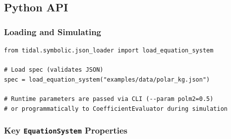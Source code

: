 \subsection{Python API}
\label{sec:json-python-api}

\subsubsection{Loading and Simulating}
\label{sec:json-loading}

\begin{lstlisting}[style=python]
from tidal.symbolic.json_loader import load_equation_system

# Load spec (validates JSON)
spec = load_equation_system("examples/data/polar_kg.json")

# Runtime parameters are passed via CLI (--param polm2=0.5)
# or programmatically to CoefficientEvaluator during simulation
\end{lstlisting}

\subsubsection{Key \texttt{EquationSystem} Properties}
\label{sec:json-equation-system}

